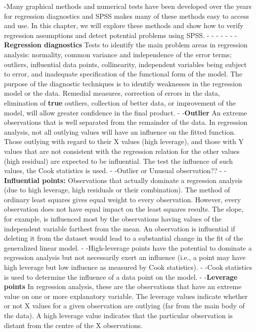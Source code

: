 -Many graphical methods and numerical tests have been developed over the years for regression diagnostics and SPSS makes many of these methods easy to access and use. In this chapter, we will explore these methods and show how to verify regression assumptions and detect potential problems using SPSS.
-
-
-
-
-
-
-\textbf{Regression diagnostics} Tests to identify the main problem areas in regression analysis: normality, common variance and independence of the error terms; outliers, influential data points, collinearity, independent variables being subject to error, and inadequate specification of the functional form of the model. The purpose of the diagnostic techniques is to identify weaknesses in the regression model or the data. Remedial measures, correction of errors in the data, elimination of \textbf{true} outliers, collection of better data, or improvement of the model, will allow greater confidence in the final product.
-
-\textbf{Outlier} An extreme observations that is well separated from the remainder of the data. In regression analysis, not all outlying values will have an influence on the fitted function. Those outlying with regard to their X values (high leverage), and those with Y values that are not consistent with the regression relation for the other values (high residual) are expected to be influential. The test the influence of such values, the Cook statistics is used.
-
-Outlier or Unusual observation??
-
-\textbf{Influential points:} Observations that actually dominate a regression analysis (due to high leverage, high residuals or their combination). The method of ordinary least squares gives equal weight to every observation. However, every observation does not have equal impact on the least squares results. The slope, for example, is influenced most by the observations having values of the independent variable farthest from the mean. An observation is influential if deleting it from the dataset would lead to a substantial change in the fit of the generalized linear model.
-
-High-leverage points have the potential to dominate a regression analysis but not necessarily exert an influence (i.e., a point may have high leverage but low influence as measured by Cook statistics).
-
-Cook statistics is used to determine the influence of a data point on the model.
-
-\textbf{Leverage points} In regression analysis, these are the observations that have an extreme value on one or more explanatory variable. The leverage values indicate whether or not X values for a given observation are outlying (far from the main body of the data). A high leverage value indicates that the particular observation is distant from the centre of the X observations.
